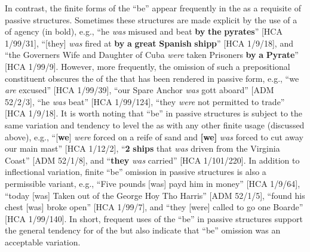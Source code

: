In contrast, the finite forms of the  “be” appear frequently in the  as a requisite of passive structures. Sometimes these structures are made explicit by the use of a  of agency (in bold), e.g., “he \textit{was} misused and beat \textbf{by} \textbf{the} \textbf{pyrates}” [HCA 1/99/31], “[they] \textit{was}\textbf{ }fired at \textbf{by} \textbf{a} \textbf{great} \textbf{Spanish} \textbf{shipp}” [HCA 1/9/18], and “the Governers Wife and Daughter of Cuba \textit{were} taken Prisoners \textbf{by} \textbf{a} \textbf{Pyrate}” [HCA 1/99/9]. However, more frequently, the omission of such a prepositional constituent obscures the  of the  that has been rendered in passive form, e.g., “we \textit{are} excused” [HCA 1/99/39], “our Spare Anchor \textit{was} gott aboard” [ADM 52/2/3], “he \textit{was} beat” [HCA 1/99/124], “they \textit{were} not permitted to trade” [HCA 1/9/18]. It is worth noting that “be” in passive structures is subject to the same variation and tendency to level the  as with any other finite usage (discussed above), e.g., “[\textbf{we}] \textit{were} forced on a reife of sand and \textbf{[we]} \textit{was} forced to cut away our main mast” [HCA 1/12/2], “\textbf{2} \textbf{ships} that \textit{was} driven from the Virginia Coast” [ADM 52/1/8], and “\textbf{they} \textit{was} carried” [HCA 1/101/220]. In addition to inflectional variation, finite “be” omission in passive structures is also a permissible variant, e.g., “Five pounds [was] payd him in money” [HCA 1/9/64], “today [was] Taken out of the George Hoy Tho Harris” [ADM 52/1/5], “found his chest [was] broke open” [HCA 1/99/7], and “they [were] called to go one Boarde” [HCA 1/99/140]. In short, frequent uses of the  “be” in passive structures support the general tendency for  of the  but also indicate that “be” omission was an acceptable variation. 

